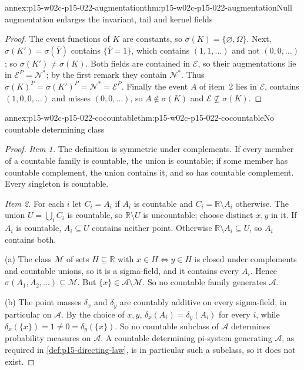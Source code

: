 \begin{annexitem}{annex:p15-w02c-p15-022-augmentation}{thm:p15-w02c-p15-022-augmentation}{Null augmentation enlarges the invariant, tail and kernel fields}
\begin{proof}
The event functions of \(K\) are constants, so
\(\sigma(K)=\{\varnothing,\Omega\}\). Next,
\(\sigma(K')=\sigma(\bar Y)\) contains \(\{\bar Y=1\}\), which contains
\((1,1,\ldots)\) and not \((0,0,\ldots)\); so
\(\sigma(K')\neq\sigma(K)\). Both fields are contained in \(\mathcal E\),
so their augmentations lie in \(\mathcal E^{P}=\mathcal N^*\); by the
first remark they contain \(\mathcal N^*\). Thus
\(\sigma(K)^{P}=\sigma(K')^{P}=\mathcal N^*=\mathcal E^{P}\). Finally the
event \(A\) of item~2 lies in \(\mathcal E\), contains
\((1,0,0,\ldots)\) and misses \((0,0,\ldots)\), so
\(A\notin\sigma(K)\) and \(\mathcal E\not\subseteq\sigma(K)\).
\end{proof}
\end{annexitem}

\begin{annexitem}{annex:p15-w02c-p15-022-cocountable}{thm:p15-w02c-p15-022-cocountable}{No countable determining class}
\begin{proof}
\emph{Item 1.} The definition is symmetric under complements. If every
member of a countable family is countable, the union is countable; if
some member has countable complement, the union contains it, and so has
countable complement. Every singleton is countable.

\emph{Item 2.} For each \(i\) let \(C_i=A_i\) if \(A_i\) is countable and
\(C_i=\mathbb R\setminus A_i\) otherwise. The union
\(U=\bigcup_iC_i\) is countable, so \(\mathbb R\setminus U\) is
uncountable; choose distinct \(x,y\) in it. If \(A_i\) is countable,
\(A_i\subseteq U\) contains neither point. Otherwise
\(\mathbb R\setminus A_i\subseteq U\), so \(A_i\) contains both.

(a) The class \(\mathcal M\) of sets \(H\subseteq\mathbb R\) with
\(x\in H\Leftrightarrow y\in H\) is closed under complements and countable
unions, so it is a sigma-field, and it contains every \(A_i\). Hence
\(\sigma(A_1,A_2,\ldots)\subseteq\mathcal M\). But
\(\{x\}\in\mathcal A\setminus\mathcal M\). So no countable family
generates \(\mathcal A\).

(b) The point masses \(\delta_x\) and \(\delta_y\) are countably additive
on every sigma-field, in particular on \(\mathcal A\). By the choice of
\(x,y\), \(\delta_x(A_i)=\delta_y(A_i)\) for every \(i\), while
\(\delta_x(\{x\})=1\neq0=\delta_y(\{x\})\). So no countable subclass of
\(\mathcal A\) determines probability measures on \(\mathcal A\). A
countable determining pi-system generating \(\mathcal A\), as required
in \cref{def:p15-directing-law}, is in particular such a subclass, so it
does not exist.


\end{proof}
\end{annexitem}
